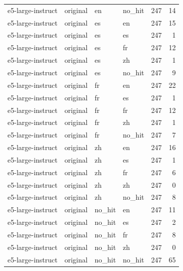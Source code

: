 \begin{tabular}{llllrr}
e5-large-instruct & original & en & no\_hit & 247 & 14 \\
e5-large-instruct & original & es & en & 247 & 15 \\
e5-large-instruct & original & es & es & 247 & 1 \\
e5-large-instruct & original & es & fr & 247 & 12 \\
e5-large-instruct & original & es & zh & 247 & 1 \\
e5-large-instruct & original & es & no\_hit & 247 & 9 \\
e5-large-instruct & original & fr & en & 247 & 22 \\
e5-large-instruct & original & fr & es & 247 & 1 \\
e5-large-instruct & original & fr & fr & 247 & 12 \\
e5-large-instruct & original & fr & zh & 247 & 1 \\
e5-large-instruct & original & fr & no\_hit & 247 & 7 \\
e5-large-instruct & original & zh & en & 247 & 16 \\
e5-large-instruct & original & zh & es & 247 & 1 \\
e5-large-instruct & original & zh & fr & 247 & 6 \\
e5-large-instruct & original & zh & zh & 247 & 0 \\
e5-large-instruct & original & zh & no\_hit & 247 & 8 \\
e5-large-instruct & original & no\_hit & en & 247 & 11 \\
e5-large-instruct & original & no\_hit & es & 247 & 2 \\
e5-large-instruct & original & no\_hit & fr & 247 & 8 \\
e5-large-instruct & original & no\_hit & zh & 247 & 0 \\
e5-large-instruct & original & no\_hit & no\_hit & 247 & 65 \\
\bottomrule
\end{tabular}
